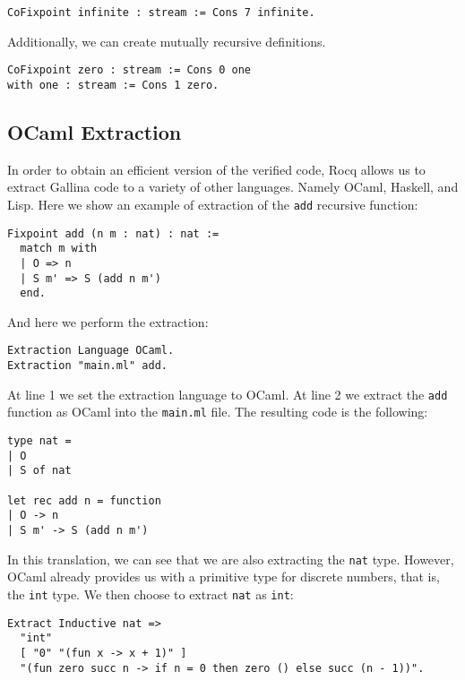 \begin{lstlisting}[style=Rocq]
CoFixpoint infinite : stream := Cons 7 infinite.
\end{lstlisting}

Additionally, we can create mutually recursive definitions.

\begin{lstlisting}[style=Rocq]
CoFixpoint zero : stream := Cons 0 one
with one : stream := Cons 1 zero.
\end{lstlisting}

\subsection{OCaml Extraction}
\label{subsec:extract}

In order to obtain an efficient version of the verified code, Rocq allows us to extract Gallina code to a variety of other languages. Namely OCaml, Haskell, and Lisp. Here we show an example of extraction of the \texttt{add} recursive function:

\begin{lstlisting}[style=Rocq]
Fixpoint add (n m : nat) : nat :=
  match m with
  | O => n
  | S m' => S (add n m')
  end.
\end{lstlisting}

And here we perform the extraction:

\begin{lstlisting}[style=Rocq]
Extraction Language OCaml.
Extraction "main.ml" add.
\end{lstlisting}

At line 1 we set the extraction language to OCaml. At line 2 we extract the \texttt{add} function as OCaml into the \texttt{main.ml} file. The resulting code is the following:

\begin{lstlisting}[style=OCaml]
type nat =
| O
| S of nat

let rec add n = function
| O -> n
| S m' -> S (add n m')
\end{lstlisting}

In this translation, we can see that we are also extracting the \texttt{nat} type. However, OCaml already provides us with a primitive type for discrete numbers, that is, the \texttt{int} type. We then choose to extract \texttt{nat} as \texttt{int}:

\begin{lstlisting}[style=OCaml]
Extract Inductive nat =>
  "int"
  [ "0" "(fun x -> x + 1)" ]
  "(fun zero succ n -> if n = 0 then zero () else succ (n - 1))".
\end{lstlisting}

